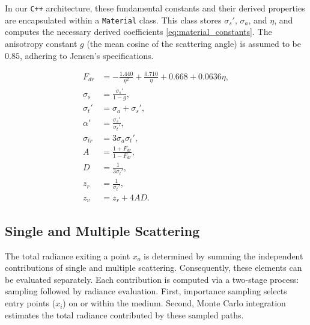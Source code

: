 \documentclass[sigconf,nonacm]{acmart}
\begin{document}
In our \texttt{C++} architecture, these fundamental constants and their derived properties are encapsulated within a \texttt{Material} class. This class stores $\sigma_s'$, $\sigma_a$, and $\eta$, and computes the necessary derived coefficients \eqref{eq:material_constants}. The anisotropy constant $g$ (the mean cosine of the scattering angle) is assumed to be $0.85$, adhering to Jensen's specifications.

\begin{subequations}
    \label{eq:material_constants}
    \begin{align}
        F_{dr}      & = -\frac{1.440}{\eta^2} + \frac{0.710}{\eta} + 0.668 + 0.0636 \eta, \\
        \sigma_s    & = \frac{\sigma_s'}{1 - g},                                          \\
        \sigma_t'   & = \sigma_a + \sigma_s',                                             \\
        \alpha'     & = \frac{\sigma_s'}{\sigma_t'},                                      \\
        \sigma_{tr} & = 3 \sigma_a \sigma_t',                                             \\
        A           & = \frac{1 + F_{dr}}{1 - F_{dr}},                                    \\
        D           & = \frac{1}{3 \sigma_t'},                                            \\
        z_r         & = \frac{1}{\sigma_t'},                                              \\
        z_v         & = z_r + 4 A D.
    \end{align}
\end{subequations}


\subsection{Single and Multiple Scattering}

The total radiance exiting a point $x_o$ is determined by summing the independent contributions of single and multiple scattering. Consequently, these elements can be evaluated separately. Each contribution is computed via a two-stage process: sampling followed by radiance evaluation. First, importance sampling selects entry points ($x_i$) on or within the medium. Second, Monte Carlo integration estimates the total radiance contributed by these sampled paths.
\end{document}
